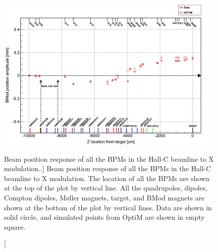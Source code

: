 \begin{singlespace}
\begin{figure}[!h]
	\begin{center}
	\includegraphics[width=15.0cm]{figures/BModOpticsX}
	\end{center}
	\caption
	[Beam position response of all the BPMs in the Hall-C beamline to X modulation..]	
	{Beam position response of all the BPMs in the Hall-C beamline to X modulation. The location of all the BPMs are shown at the top of the plot by vertical line. All the quadrupoles, dipoles, Compton dipoles, M{\o}ller magnets, target, and BMod magnets are shown at the bottom of the plot by vertical lines. Data are shown in solid circle, and simulated points from OptiM are shown in empty square.}
	\label{fig:BModOpticsX}
\end{figure}
\end{singlespace}



